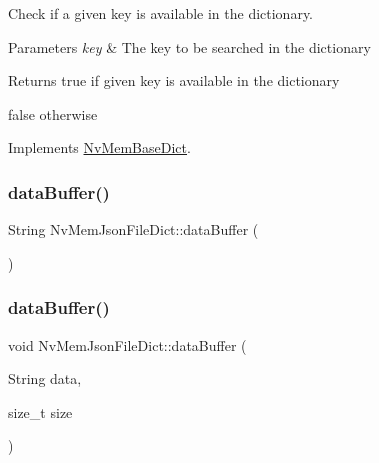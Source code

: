 Check if a given {\ttfamily key} is available in the dictionary. 


\begin{DoxyParams}{Parameters}
{\em key} & The key to be searched in the dictionary \\
\hline
\end{DoxyParams}
\begin{DoxyReturn}{Returns}
true if given key is available in the dictionary 

false otherwise 
\end{DoxyReturn}


Implements \mbox{\hyperlink{class_nv_mem_base_dict_a755616173e4c94cf2a3cd227c38660d1}{Nv\+Mem\+Base\+Dict}}.

\mbox{\label{class_nv_mem_json_file_dict_a6de6f10fa78add9b0918115ea4a220f6}} 
\subsubsection{\texorpdfstring{dataBuffer()}{dataBuffer()}\hspace{0.1cm}{\footnotesize\ttfamily [1/2]}}
{\footnotesize\ttfamily String Nv\+Mem\+Json\+File\+Dict\+::data\+Buffer (\begin{DoxyParamCaption}{ }\end{DoxyParamCaption})}

\mbox{\label{class_nv_mem_json_file_dict_a6889bd39213424ad5a8c193b957c0a30}} 
\subsubsection{\texorpdfstring{dataBuffer()}{dataBuffer()}\hspace{0.1cm}{\footnotesize\ttfamily [2/2]}}
{\footnotesize\ttfamily void Nv\+Mem\+Json\+File\+Dict\+::data\+Buffer (\begin{DoxyParamCaption}\item[{String}]{data,  }\item[{size\+\_\+t}]{size }\end{DoxyParamCaption})}

\mbox{\label{class_nv_mem_json_file_dict_a247a229358e0530870801da4daaa717c}} 
